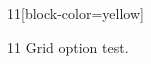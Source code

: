 \documentclass[paper=A4]{ropas-poster}
\begin{document}
\begin{postergrid}{1}{1}[block-color=yellow]
\begin{posterblock}{1}{1}
Grid option test.
\end{posterblock}
\end{postergrid}
\end{document}
